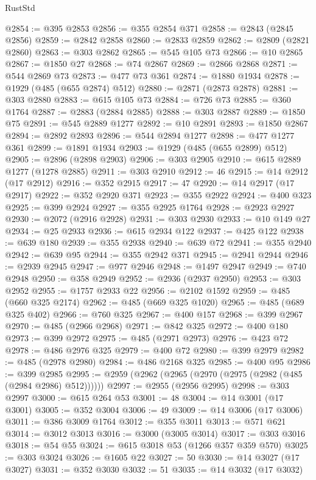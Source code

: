 \begin{lexlean}{RustStd}
\begin{coremodule}
@2854 := @395 @2853
@2856 := @355 @2854 @371
@2858 := @2843 (@2845 @2856)
@2859 := @2842 @2858
@2860 := @2833 @2859
@2862 := @2809 (@2821 @2860)
@2863 := @303 @2862
@2865 := @545 @105 @73
@2866 := @10 @2865
@2867 := @1850 @27
@2868 := @74 @2867
@2869 := @2866 @2868
@2871 := @544 @2869 @73
@2873 := @477 @73 @361
@2874 := @1880 @1934
@2878 := @1929 (@485 (@655 @2874) @512)
@2880 := @2871 (@2873 @2878)
@2881 := @303 @2880
@2883 := @615 @105 @73
@2884 := @726 @73
@2885 := @360 @1764
@2887 := @2883 (@2884 @2885)
@2888 := @303 @2887
@2889 := @1850 @75
@2891 := @545 @2889 @1277
@2892 := @10 @2891
@2893 := @1850 @2867
@2894 := @2892 @2893
@2896 := @544 @2894 @1277
@2898 := @477 @1277 @361
@2899 := @1891 @1934
@2903 := @1929 (@485 (@655 @2899) @512)
@2905 := @2896 (@2898 @2903)
@2906 := @303 @2905
@2910 := @615 @2889 @1277 (@1278 @2885)
@2911 := @303 @2910
@2912 := 46
@2915 := @14 @2912 (@17 @2912)
@2916 := @352 @2915
@2917 := 47
@2920 := @14 @2917 (@17 @2917)
@2922 := @352 @2920 @371
@2923 := @355 @2922
@2924 := @400 @323
@2925 := @399 @2924
@2927 := @355 @2925 @1764
@2928 := @2923 @2927
@2930 := @2072 (@2916 @2928)
@2931 := @303 @2930
@2933 := @10 @149 @27
@2934 := @25 @2933
@2936 := @615 @2934 @122
@2937 := @425 @122
@2938 := @639 @180
@2939 := @355 @2938
@2940 := @639 @72
@2941 := @355 @2940
@2942 := @639 @95
@2944 := @355 @2942 @371
@2945 := @2941 @2944
@2946 := @2939 @2945
@2947 := @977 @2946
@2948 := @1497 @2947
@2949 := @740 @2948
@2950 := @358 @2949
@2952 := @2936 (@2937 @2950)
@2953 := @303 @2952
@2955 := @1757 @2933 @22
@2956 := @2102 @1592
@2959 := @485 (@660 @325 @2174)
@2962 := @485 (@669 @325 @1020)
@2965 := @485 (@689 @325 @402)
@2966 := @760 @325
@2967 := @400 @157
@2968 := @399 @2967
@2970 := @485 (@2966 @2968)
@2971 := @842 @325
@2972 := @400 @180
@2973 := @399 @2972
@2975 := @485 (@2971 @2973)
@2976 := @423 @72
@2978 := @486 @2976 @325
@2979 := @400 @72
@2980 := @399 @2979
@2982 := @485 (@2978 @2980)
@2984 := @486 @2168 @325
@2985 := @400 @95
@2986 := @399 @2985
@2995 := @2959 (@2962 (@2965 (@2970 (@2975 (@2982 (@485 (@2984 @2986) @512))))))
@2997 := @2955 (@2956 @2995)
@2998 := @303 @2997
@3000 := @615 @264 @53
@3001 := 48
@3004 := @14 @3001 (@17 @3001)
@3005 := @352 @3004
@3006 := 49
@3009 := @14 @3006 (@17 @3006)
@3011 := @386 @3009 @1764
@3012 := @355 @3011
@3013 := @571 @621
@3014 := @3012 @3013
@3016 := @3000 (@3005 @3014)
@3017 := @303 @3016
@3018 := @54 @55
@3024 := @615 @3018 @53 (@1266 @357 @359 @570)
@3025 := @303 @3024
@3026 := @1605 @22
@3027 := 50
@3030 := @14 @3027 (@17 @3027)
@3031 := @352 @3030
@3032 := 51
@3035 := @14 @3032 (@17 @3032)

\end{coremodule}
\end{lexlean}
